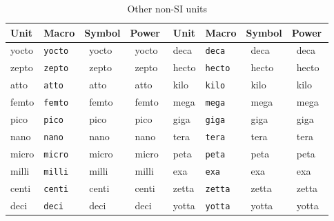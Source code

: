 \documentclass{article}
\def\Backslash{\copy\slashbox}
\begin{document}
\def\showprefix#1{#1 & \texttt{\Backslash#1} & \si{\csname#1\endcsname} & \si[prefixes-as-symbols=false]{\csname#1\endcsname}}
\begin{table}
\caption{Other non-SI units}
\centering
\begin{tabular}{llllllll}\hline\hline
Unit & Macro & Symbol & Power &
Unit & Macro & Symbol & Power \\\hline
\showprefix{yocto} & \showprefix{deca}\\
\showprefix{zepto} & \showprefix{hecto}\\
\showprefix{atto}  & \showprefix{kilo}\\
\showprefix{femto} & \showprefix{mega}\\
\showprefix{pico}  & \showprefix{giga}\\
\showprefix{nano}  & \showprefix{tera}\\
\showprefix{micro} & \showprefix{peta}\\
\showprefix{milli} & \showprefix{exa}\\
\showprefix{centi} & \showprefix{zetta}\\
\showprefix{deci}  & \showprefix{yotta}\\
\end{tabular}
\end{table}
\end{document}
